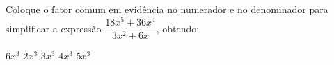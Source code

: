 Coloque o fator comum em evidência no numerador e no denominador para simplificar a expressão $\dfrac{18x^5+36x^4}{3x^2+6x}$, obtendo:

$6x^3$
$2x^3$
$3x^3$
$4x^3$
$5x^3$



